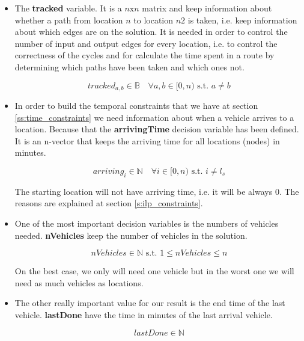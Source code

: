 \documentclass[]{report}
\begin{document}
\begin{itemize}
	\item The \textbf{tracked} variable. It is a $n \text{x} n$ matrix and keep information about whether a path from location $n$ to location $n2$ is taken, i.e. keep information about which edges are on the solution. It is needed in order to control the number of input and output edges for every location, i.e. to control the correctness of the cycles and for calculate the time spent in a route by determining which paths have been taken and which ones not.
	
	$$tracked_{a,b} \in \mathbb{B} \quad \forall a,b \in [0, n) \text{ s.t. } a \neq b$$
	
	\item In order to build the temporal constraints that we have at section \ref{ss:time_constraints} we need information about when a vehicle arrives to a location. Because that the \textbf{arrivingTime} decision variable has been defined. It is an n-vector that keeps the arriving time for all locations (nodes) in minutes.
	
	$$arriving_{i} \in \mathbb{N} \quad \forall i \in [0, n) \text{ s.t. } i \neq l_{s}$$

	The starting location will not have arriving time, i.e. it will be always 0. The reasons are explained at section \ref{s:ilp_constraints}.
	
	\item One of the most important decision variables is the numbers of vehicles needed. \textbf{nVehicles} keep the number of vehicles in the solution.

	$$nVehicles \in \mathbb{N} \text{ s.t. } 1 \leq nVehicles \leq n$$
	
	On the best case, we only will need one vehicle but in the worst one we will need as much vehicles as locations.
	
	\item The other really important value for our result is the end time of the last vehicle. \textbf{lastDone} have the time in minutes of the last arrival vehicle.
	
	$$lastDone \in \mathbb{N}$$
	
\end{itemize}

\end{document}

